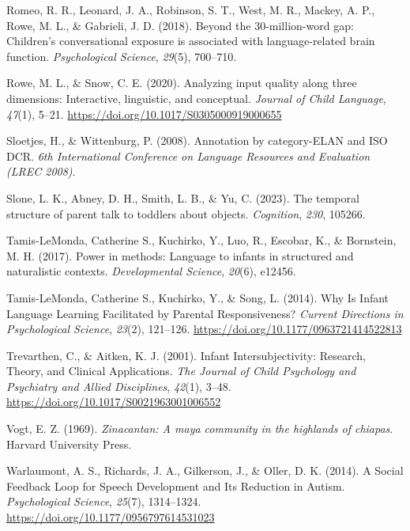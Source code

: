 \documentclass[
  man]{apa6}
\newlength{\cslhangindent}
\newlength{\cslentryspacingunit} %
\newenvironment{CSLReferences}[2] %
 {%
  \setlength{\parindent}{0pt}
  \ifodd #1
  \let\oldpar\par
  \def\par{\hangindent=\cslhangindent\oldpar}
  \fi
  \setlength{\parskip}{#2\cslentryspacingunit}
 }%
 {}
\begin{document}
\begin{CSLReferences}{1}{0}
\leavevmode{}%
Romeo, R. R., Leonard, J. A., Robinson, S. T., West, M. R., Mackey, A. P., Rowe, M. L., \& Gabrieli, J. D. (2018). Beyond the 30-million-word gap: Children's conversational exposure is associated with language-related brain function. \emph{Psychological Science}, \emph{29}(5), 700--710.

\leavevmode{}%
Rowe, M. L., \& Snow, C. E. (2020). Analyzing input quality along three dimensions: Interactive, linguistic, and conceptual. \emph{Journal of Child Language}, \emph{47}(1), 5--21. \url{https://doi.org/10.1017/S0305000919000655}

\leavevmode{}%
Sloetjes, H., \& Wittenburg, P. (2008). Annotation by category-ELAN and ISO DCR. \emph{6th International Conference on Language Resources and Evaluation (LREC 2008)}.

\leavevmode{}%
Slone, L. K., Abney, D. H., Smith, L. B., \& Yu, C. (2023). The temporal structure of parent talk to toddlers about objects. \emph{Cognition}, \emph{230}, 105266.

\leavevmode{}%
Tamis-LeMonda, Catherine S., Kuchirko, Y., Luo, R., Escobar, K., \& Bornstein, M. H. (2017). Power in methods: Language to infants in structured and naturalistic contexts. \emph{Developmental Science}, \emph{20}(6), e12456.

\leavevmode{}%
Tamis-LeMonda, Catherine S., Kuchirko, Y., \& Song, L. (2014). Why {Is} {Infant} {Language} {Learning} {Facilitated} by {Parental} {Responsiveness}? \emph{Current Directions in Psychological Science}, \emph{23}(2), 121--126. \url{https://doi.org/10.1177/0963721414522813}

\leavevmode{}%
Trevarthen, C., \& Aitken, K. J. (2001). Infant {Intersubjectivity}: {Research}, {Theory}, and {Clinical} {Applications}. \emph{The Journal of Child Psychology and Psychiatry and Allied Disciplines}, \emph{42}(1), 3--48. \url{https://doi.org/10.1017/S0021963001006552}

\leavevmode{}%
Vogt, E. Z. (1969). \emph{Zinacantan: A maya community in the highlands of chiapas}. Harvard University Press.

\leavevmode{}%
Warlaumont, A. S., Richards, J. A., Gilkerson, J., \& Oller, D. K. (2014). A {Social} {Feedback} {Loop} for {Speech} {Development} and {Its} {Reduction} in {Autism}. \emph{Psychological Science}, \emph{25}(7), 1314--1324. \url{https://doi.org/10.1177/0956797614531023}


\end{CSLReferences}
\end{document}
